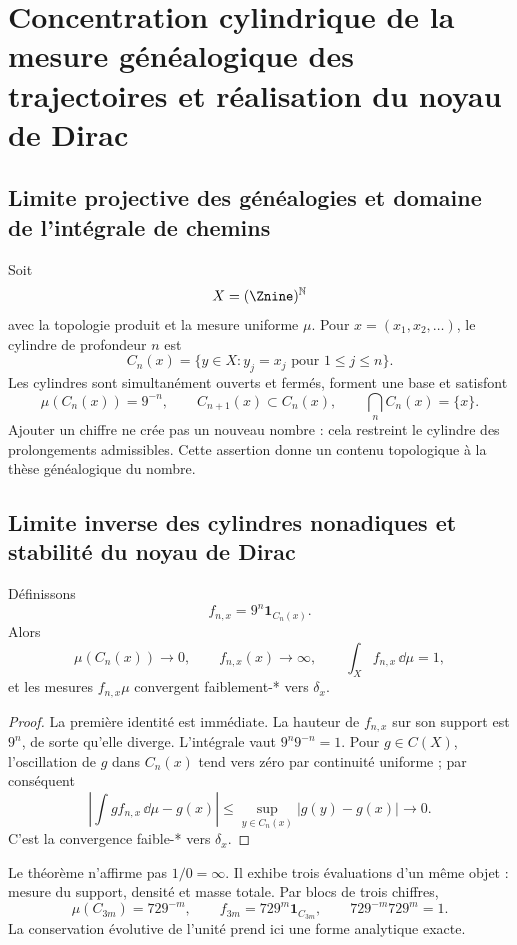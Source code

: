 \chapter{Concentration cylindrique de la mesure généalogique des trajectoires et réalisation du noyau de Dirac}

\section{Limite projective des généalogies et domaine de l'intégrale de chemins}

Soit
\[
X=(\Znine)^{\mathbb N}
\]
avec la topologie produit et la mesure uniforme \(\mu\). Pour
\(x=(x_1,x_2,\ldots)\), le cylindre de profondeur \(n\) est
\[
C_n(x)=\{y\in X:y_j=x_j\text{ pour }1\le j\le n\}.
\]
Les cylindres sont simultanément ouverts et fermés, forment une base et
satisfont
\[
\mu(C_n(x))=9^{-n},\qquad
C_{n+1}(x)\subset C_n(x),\qquad
\bigcap_n C_n(x)=\{x\}.
\]
Ajouter un chiffre ne crée pas un nouveau nombre : cela restreint le cylindre des
prolongements admissibles. Cette assertion donne un contenu topologique à la thèse
généalogique du nombre.

\section{Limite inverse des cylindres nonadiques et stabilité du noyau de Dirac}

\begin{theorem}
Définissons
\[
f_{n,x}=9^n\mathbf1_{C_n(x)}.
\]
Alors
\[
\mu(C_n(x))\to0,\qquad f_{n,x}(x)\to\infty,\qquad
\int_Xf_{n,x}\,\dd\mu=1,
\]
et les mesures \(f_{n,x}\mu\) convergent faiblement-* vers \(\delta_x\).
\end{theorem}

\begin{proof}
La première identité est immédiate. La hauteur de \(f_{n,x}\) sur son support
est \(9^n\), de sorte qu'elle diverge. L'intégrale vaut
\(9^n9^{-n}=1\). Pour \(g\in C(X)\), l'oscillation de \(g\) dans \(C_n(x)\)
tend vers zéro par continuité uniforme ; par conséquent
\[
\left|\int g f_{n,x}\,\dd\mu-g(x)\right|
\le \sup_{y\in C_n(x)}|g(y)-g(x)|\longrightarrow0.
\]
C'est la convergence faible-* vers \(\delta_x\).
\end{proof}

Le théorème n'affirme pas \(1/0=\infty\). Il exhibe trois évaluations d'un même
objet : mesure du support, densité et masse totale. Par blocs de trois chiffres,
\[
\mu(C_{3m})=729^{-m},\qquad
f_{3m}=729^m\mathbf1_{C_{3m}},\qquad
729^{-m}729^m=1.
\]
La conservation évolutive de l'unité prend ici une forme analytique exacte.

